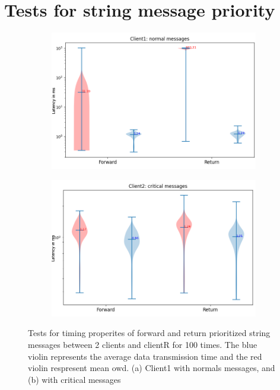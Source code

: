 \section{Tests for string message priority}\label{chap: append-string-priority}
%
\begin{figure}[h]
    \centering
    \begin{subfigure}[b]{0.6\textwidth}
    \centering
    \includegraphics[width=\textwidth]{figures/appendix/priority_tests/log_violin_2clients_string_priority_client1.png}\hfill 
    \caption{} \label{fig: priority-2clients-string-1}
    \end{subfigure}
    \begin{subfigure}[b]{0.6\textwidth}
        \centering
        \includegraphics[width=\textwidth]{figures/appendix/priority_tests/log_violin_2clients_string_priority_client2.png}\hfill 
        \caption{} \label{fig: priority-2clients-string-2}
    \end{subfigure}
    
    
    \caption{Tests for timing properites of forward and return prioritized string messages between 2 clients 
    and clientR for 100 times. The blue violin represents the average data transmission time and the red violin 
    respresent mean \gls{owd}. (a) Client1 with normals messages, and (b) 
    with critical messages} \label{fig: priority-2clients-string}
\end{figure}



